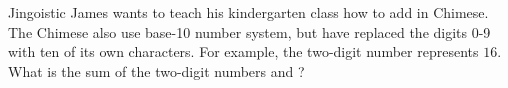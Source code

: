 Jingoistic James wants to teach his kindergarten class how to add in Chimese. The Chimese also use base-10 number system, but have replaced the digits 0-9 with ten of its own characters. For example, the two-digit number \shi\liu{} represents $16$. What is the sum of the two-digit numbers \shi\liu{} and \liu\shi?
